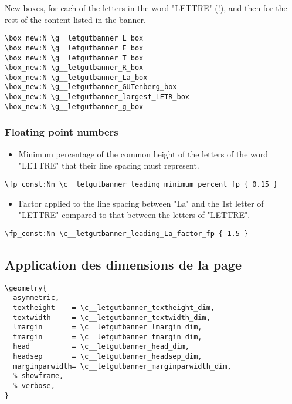 \documentclass{letgut}
\begin{document}
New boxes, for each of the letters in the word "LETTRE" (!), and then for the
rest of the content listed in the banner.
\begin{lstlisting}
\box_new:N \g__letgutbanner_L_box
\box_new:N \g__letgutbanner_E_box
\box_new:N \g__letgutbanner_T_box
\box_new:N \g__letgutbanner_R_box
\box_new:N \g__letgutbanner_La_box
\box_new:N \g__letgutbanner_GUTenberg_box
\box_new:N \g__letgutbanner_largest_LETR_box
\box_new:N \g__letgutbanner_g_box
\end{lstlisting}

\subsubsection{Floating point numbers}
\label{sec:org61842b5}

\begin{itemize}
\item Minimum percentage of the common height of the letters of the word "LETTRE"
that their line spacing must represent.
\end{itemize}
\begin{lstlisting}
\fp_const:Nn \c__letgutbanner_leading_minimum_percent_fp { 0.15 }
\end{lstlisting}
\begin{itemize}
\item Factor applied to the line spacing between "La" and the 1st letter of
"LETTRE" compared to that between the letters of "LETTRE".
\end{itemize}
\begin{lstlisting}
\fp_const:Nn \c__letgutbanner_leading_La_factor_fp { 1.5 }
\end{lstlisting}

\subsection{Application des dimensions de la page}
\label{sec:orgb3e9382}

\begin{lstlisting}
\geometry{
  asymmetric,
  textheight    = \c__letgutbanner_textheight_dim,
  textwidth     = \c__letgutbanner_textwidth_dim,
  lmargin       = \c__letgutbanner_lmargin_dim,
  tmargin       = \c__letgutbanner_tmargin_dim,
  head          = \c__letgutbanner_head_dim,
  headsep       = \c__letgutbanner_headsep_dim,
  marginparwidth= \c__letgutbanner_marginparwidth_dim,
  % showframe,
  % verbose,
}
\end{lstlisting}
\end{document}
